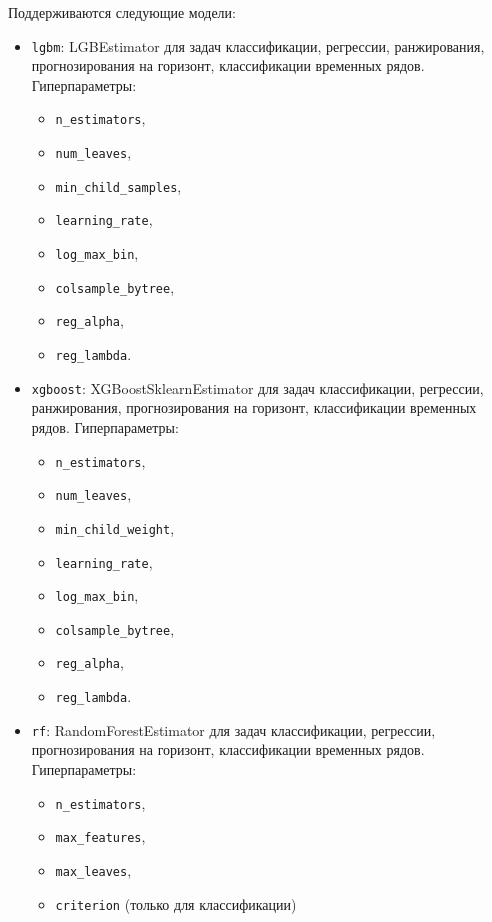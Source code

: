 \documentclass[%
	11pt,
	a4paper,
	utf8,
		]{article}
\begin{document}
Поддерживаются следующие модели:
\begin{itemize}
	\item \verb|lgbm|: LGBEstimator для задач классификации, регрессии, ранжирования, прогнозирования на горизонт, классификации временных рядов. Гиперпараметры:
	\begin{itemize}
		\item \verb|n_estimators|,
		\item \verb|num_leaves|,
		\item \verb|min_child_samples|,
		\item \verb|learning_rate|,
		\item \verb|log_max_bin|,
		\item \verb|colsample_bytree|,
		\item \verb|reg_alpha|,
		\item \verb|reg_lambda|.
	\end{itemize}

	\item \verb|xgboost|: XGBoostSklearnEstimator для задач классификации, регрессии, ранжирования, прогнозирования на горизонт, классификации временных рядов. Гиперпараметры:
    \begin{itemize}
		\item \verb|n_estimators|,
		\item \verb|num_leaves|,
		\item \verb|min_child_weight|,
		\item \verb|learning_rate|,
		\item \verb|log_max_bin|,
		\item \verb|colsample_bytree|,
		\item \verb|reg_alpha|,
		\item \verb|reg_lambda|.
    \end{itemize}

    \item \verb|rf|: RandomForestEstimator для задач классификации, регрессии, прогнозирования на горизонт, классификации временных рядов. Гиперпараметры:
    \begin{itemize}
    	\item \verb|n_estimators|,
    	
    	\item \verb|max_features|,
    	
    	\item \verb|max_leaves|,
    	
    	\item \verb|criterion| (только для классификации)
    \end{itemize}


\end{itemize}
\end{document}
